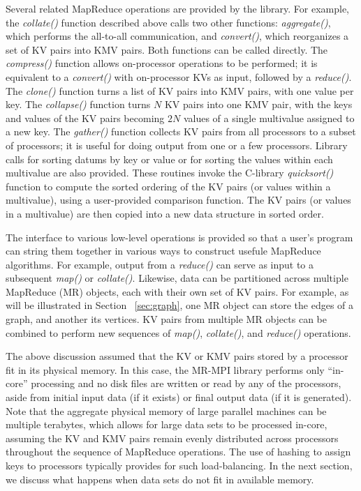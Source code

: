 Several related MapReduce operations are provided by the library.  For
example, the {\it collate()} function described above calls two other
functions: {\it aggregate()}, which performs the all-to-all
communication, and {\it convert()}, which reorganizes a set of KV
pairs into KMV pairs.  Both functions can be called directly.  The
{\it compress()} function allows on-processor operations to be
performed; it is equivalent to a {\it convert()} with on-processor KVs
as input, followed by a {\it reduce()}.  The {\it clone()} function
turns a list of KV pairs into KMV pairs, with one value per key.  The
{\it collapse()} function turns $N$ KV pairs into one KMV pair, with
the keys and values of the KV pairs becoming $2N$ values of a single
multivalue assigned to a new key.  The {\it gather()} function
collects KV pairs from all processors to a subset of processors; it is
useful for doing output from one or a few processors.  Library calls
for sorting datums by key or value or for sorting the values within
each multivalue are also provided.  These routines invoke the
C-library {\it quicksort()} function to compute the sorted ordering of
the KV pairs (or values within a multivalue), using a user-provided
comparison function.  The KV pairs (or values in a multivalue) are
then copied into a new data structure in sorted order.

The interface to various low-level operations is provided so that a
user's program can string them together in various ways to construct
usefule MapReduce algorithms.  For example, output from a {\it
reduce()} can serve as input to a subsequent {\it map()} or {\it
collate()}.  Likewise, data can be partitioned across multiple
MapReduce (MR) objects, each with their own set of KV pairs.  For
example, as will be illustrated in Section ~\ref{sec:graph}, one MR
object can store the edges of a graph, and another its vertices.  KV
pairs from multiple MR objects can be combined to perform new
sequences of {\it map()}, {\it collate()}, and {\it reduce()}
operations.

The above discussion assumed that the KV or KMV pairs stored by a
processor fit in its physical memory.  In this case, the MR-MPI
library performs only ``in-core'' processing and no disk files are
written or read by any of the processors, aside from initial input
data (if it exists) or final output data (if it is generated).  Note
that the aggregate physical memory of large parallel machines can be
multiple terabytes, which allows for large data sets to be processed
in-core, assuming the KV and KMV pairs remain evenly distributed
across processors throughout the sequence of MapReduce operations.
The use of hashing to assign keys to processors typically provides for
such load-balancing.  In the next section, we discuss what happens
when data sets do not fit in available memory.
